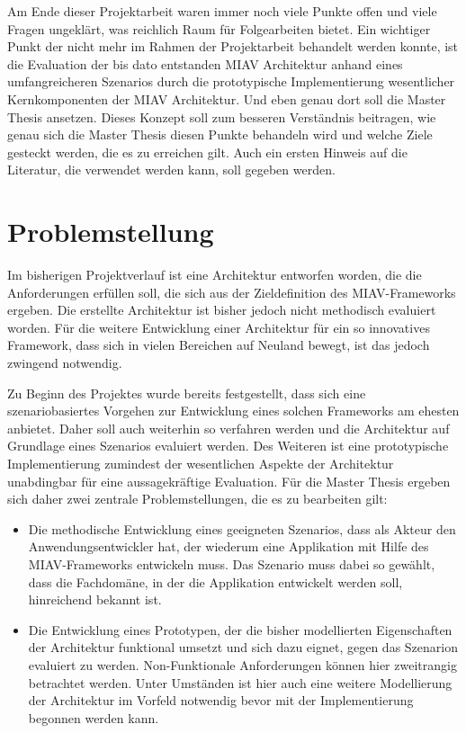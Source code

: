 \documentclass[12pt,headsepline,a4paper,bibtotoc,liststotoc,DIV12,BCOR12mm]{scrartcl}
\begin{document}
  Am Ende dieser Projektarbeit waren immer noch viele Punkte offen und viele Fragen ungeklärt, was reichlich Raum für Folgearbeiten bietet. Ein wichtiger Punkt der nicht mehr im Rahmen der Projektarbeit behandelt werden konnte, ist die Evaluation der bis dato entstanden MIAV Architektur anhand eines umfangreicheren Szenarios durch die prototypische Implementierung wesentlicher Kernkomponenten der MIAV Architektur. Und eben genau dort soll die Master Thesis ansetzen. Dieses Konzept soll zum besseren Verständnis beitragen, wie genau sich die Master Thesis diesen Punkte behandeln wird und welche Ziele gesteckt werden, die es zu erreichen gilt. Auch ein ersten Hinweis auf die Literatur, die verwendet werden kann, soll gegeben werden.


\section{Problemstellung} %
\label{sec:problemstellung}

  Im bisherigen Projektverlauf ist eine Architektur entworfen worden, die die Anforderungen erfüllen soll, die sich aus der Zieldefinition des MIAV-Frameworks ergeben. Die erstellte Architektur ist bisher jedoch nicht methodisch evaluiert worden. Für die weitere Entwicklung einer Architektur für ein so innovatives Framework, dass sich in vielen Bereichen auf Neuland bewegt, ist das jedoch zwingend notwendig.
  
  Zu Beginn des Projektes wurde bereits festgestellt, dass sich eine szenariobasiertes Vorgehen zur Entwicklung eines solchen Frameworks am ehesten anbietet. Daher soll auch weiterhin so verfahren werden und die Architektur auf Grundlage eines Szenarios evaluiert werden. Des Weiteren ist eine prototypische Implementierung zumindest der wesentlichen Aspekte der Architektur unabdingbar für eine aussagekräftige Evaluation. Für die Master Thesis ergeben sich daher zwei zentrale Problemstellungen, die es zu bearbeiten gilt:
  
  \begin{itemize}
    \item Die methodische Entwicklung eines geeigneten Szenarios, dass als Akteur den Anwendungsentwickler hat, der wiederum eine Applikation mit Hilfe des MIAV-Frameworks entwickeln muss. Das Szenario muss dabei so gewählt, dass die Fachdomäne, in der die Applikation entwickelt werden soll, hinreichend bekannt ist.
    \item Die Entwicklung eines Prototypen, der die bisher modellierten Eigenschaften der Architektur funktional umsetzt und sich dazu eignet, gegen das Szenarion evaluiert zu werden. Non-Funktionale Anforderungen können hier zweitrangig betrachtet werden. Unter Umständen ist hier auch eine weitere Modellierung der Architektur im Vorfeld notwendig bevor mit der Implementierung begonnen werden kann.
  \end{itemize}
\end{document}
